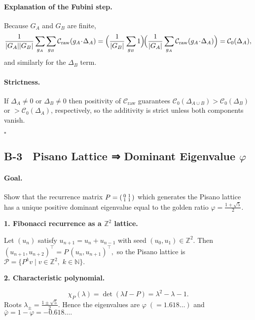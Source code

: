 \documentclass[11pt]{article}
\begin{document}
\paragraph{Explanation of the Fubini step.}
Because $G_A$ and $G_B$ are finite,
\[
\frac{1}{|G_A||G_B|}\sum_{g_A}\sum_{g_B}\mathcal{C}_{\text{raw}}(g_A\!\cdot\!\Delta_A)
=\Bigl(\frac{1}{|G_B|}\sum_{g_B}1\Bigr)\!
  \Bigl(\frac{1}{|G_A|}\sum_{g_A}\mathcal{C}_{\text{raw}}(g_A\!\cdot\!\Delta_A)\Bigr)
=\mathcal{C}_{0}(\Delta_A),
\]
and similarly for the $\Delta_B$ term.

\paragraph{Strictness.}
If \(\Delta_A\neq0\) or \(\Delta_B\neq0\) then
positivity of $\mathcal{C}_{\text{raw}}$ guarantees
$\mathcal{C}_{0}(\Delta_{A\!\cup\!B})
  >\mathcal{C}_{0}(\Delta_B)$
or
$>\mathcal{C}_{0}(\Delta_A)$, respectively, so the additivity is strict
unless both components vanish.

\medskip
\(\square\)

\subsection*{B-3 Pisano Lattice ⇒ Dominant Eigenvalue \texorpdfstring{$\varphi$}{φ}}
\label{app:pisano-phi}

\paragraph{Goal.}
Show that the recurrence matrix
\(
P=\begin{psmallmatrix}0&1\\1&1\end{psmallmatrix}
\)
which generates the Pisano lattice has a unique positive dominant
eigenvalue equal to the golden ratio
\(
\varphi=\tfrac{1+\sqrt5}{2}.
\)

\bigskip
\textbf{1. Fibonacci recurrence as a $\mathbb Z^2$ lattice.}

Let $(u_n)$ satisfy $u_{n+1}=u_n+u_{n-1}$ with seed
$(u_0,u_1)\in\mathbb Z^2\!. $
Then
\(
(u_{n+1},u_{n+2})^{\!\top}=P\,(u_n,u_{n+1})^{\!\top},
\)
so the Pisano lattice is
\(
\mathcal P=\bigl\{P^k v\mid v\in\mathbb Z^2,\;k\in\mathbb N\bigr\}.
\)

\bigskip
\textbf{2. Characteristic polynomial.}

\[
\chi_P(\lambda)=\det(\lambda I-P)=\lambda^2-\lambda-1.
\]
Roots
\(
\lambda_{\pm}=\frac{1\pm\sqrt5}{2}.
\)
Hence the eigenvalues are
\(
\varphi\;(=1.618\dots)
\)
and
\(
\bar\varphi=1-\varphi=-0.618\dots.
\)
\end{document}
